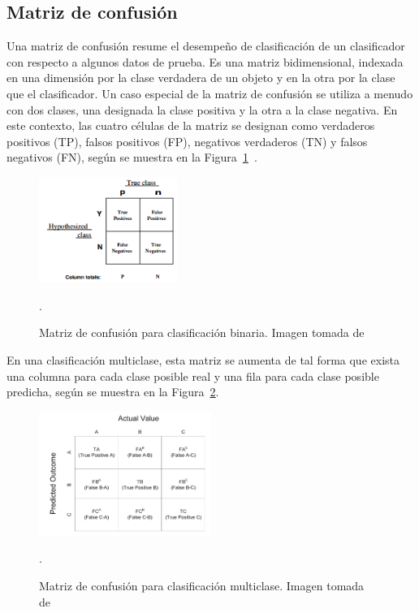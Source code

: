 \subsection{Matriz de confusión}
Una matriz de confusión resume el desempeño de clasificación de un clasificador con respecto a algunos datos de prueba. Es una matriz bidimensional, indexada en una dimensión por la clase verdadera de un objeto y en la otra por la clase que el clasificador. Un caso especial de la matriz de confusión se utiliza a menudo con dos clases, una designada la clase positiva y la otra a la clase negativa. En este contexto, las cuatro células de la matriz se designan como verdaderos positivos (TP), falsos positivos (FP), negativos verdaderos (TN) y falsos negativos (FN), según se muestra en la Figura~\ref{fig.matriz}~\cite{sammut2011encyclopedia}.

\begin{figure}[H]
	\begin{center}
		\includegraphics[width=0.4\textwidth]{figures/matriz}
		\caption{Matriz de confusión para clasificación binaria. Imagen tomada de~\cite{FAWCETT2006861}}. 
		\label{fig.matriz}
	\end{center}
\end{figure}
En una clasificación multiclase, esta matriz se aumenta de tal forma que exista una columna para cada clase posible real y una fila para cada clase posible predicha, según se muestra en la Figura~\ref{fig.matriz2}. 

\begin{figure}[H]
	\begin{center}
		\includegraphics[width=0.5\textwidth]{figures/matriz2}
		\caption{Matriz de confusión para clasificación multiclase. Imagen tomada de~\cite{kolo2011binary}}. 
		\label{fig.matriz2}
	\end{center}
\end{figure}

